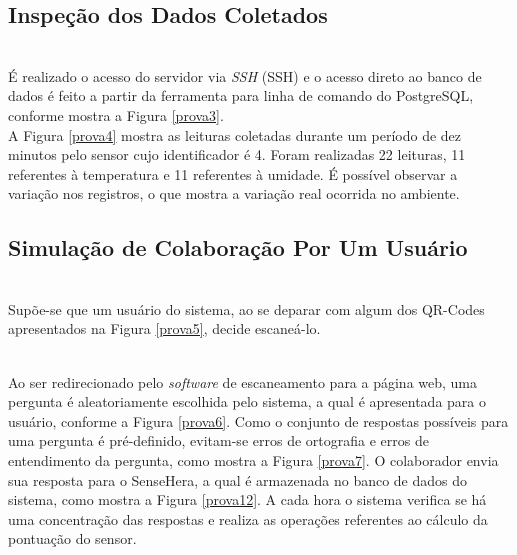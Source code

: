 \subsection{Inspeção dos Dados Coletados}
\label{subsec:dados}
\\\null \quad É realizado o acesso do servidor via \textit{\acrlong{SSH}} (\acrshort{SSH}) e o acesso direto ao banco de dados é feito a partir da ferramenta para linha de comando do PostgreSQL, conforme mostra a Figura \ref{prova3}.
\\\null \quad A Figura \ref{prova4} mostra as leituras coletadas durante um período de dez minutos pelo sensor cujo identificador é 4. Foram realizadas 22 leituras, 11 referentes à temperatura e 11 referentes à umidade. É possível observar a variação nos registros, o que mostra a variação real ocorrida no ambiente.

\subsection{Simulação de Colaboração Por Um Usuário}
\label{subsec:colaboracao}
\\\null \quad Supõe-se que um usuário do sistema, ao se deparar com algum dos QR-Codes apresentados na Figura \ref{prova5}, decide escaneá-lo.
\pagebreak
{}

\\\null \quad Ao ser redirecionado pelo \textit{software} de escaneamento para a página web, uma pergunta é aleatoriamente escolhida pelo sistema, a qual é apresentada para o usuário, conforme a Figura \ref{prova6}. Como o conjunto de respostas possíveis para uma pergunta é pré-definido, evitam-se erros de ortografia e erros de entendimento da pergunta, como mostra a Figura \ref{prova7}. O colaborador envia sua resposta para o SenseHera, a qual é armazenada no banco de dados do sistema, como mostra a Figura \ref{prova12}. A cada hora o sistema verifica se há uma concentração das respostas e realiza as operações referentes ao cálculo da pontuação do sensor.
\pagebreak
{}

